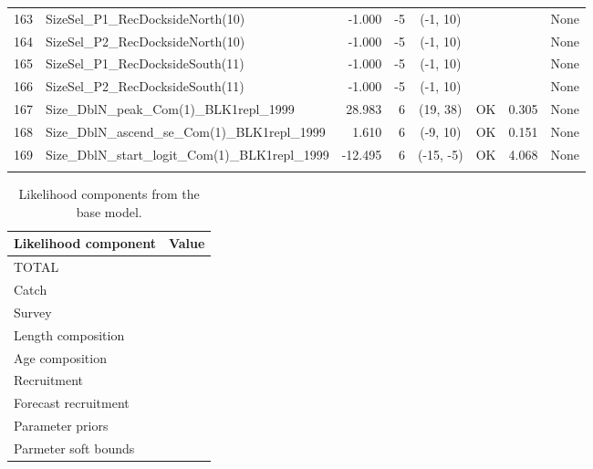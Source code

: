 \documentclass[12pt,]{article}
\begin{document}
\begin{landscape}
\begin{longtable}{rlrrcccp{1.5in}}
  163 & SizeSel\_P1\_RecDocksideNorth(10) & -1.000 & -5 & (-1, 10) &  &  & None \\ 
  164 & SizeSel\_P2\_RecDocksideNorth(10) & -1.000 & -5 & (-1, 10) &  &  & None \\ 
  165 & SizeSel\_P1\_RecDocksideSouth(11) & -1.000 & -5 & (-1, 10) &  &  & None \\ 
  166 & SizeSel\_P2\_RecDocksideSouth(11) & -1.000 & -5 & (-1, 10) &  &  & None \\ 
  167 & Size\_DblN\_peak\_Com(1)\_BLK1repl\_1999 & 28.983 & 6 & (19, 38) & OK & 0.305 & None \\ 
  168 & Size\_DblN\_ascend\_se\_Com(1)\_BLK1repl\_1999 & 1.610 & 6 & (-9, 10) & OK & 0.151 & None \\ 
  169 & Size\_DblN\_start\_logit\_Com(1)\_BLK1repl\_1999 & -12.495 & 6 & (-15, -5) & OK & 4.068 & None \\ 
   \hline
\hline
\label{tab:model_params}
\end{longtable}
\end{landscape}

\FloatBarrier

\begin{table}[ht]
\centering
\caption{Likelihood components from the base model.} 
\label{tab:like_components}
\begin{tabular}{ll}
  \hline
Likelihood component & Value \\ 
  \hline
TOTAL &  \\ 
  Catch &  \\ 
  Survey &  \\ 
  Length composition &  \\ 
  Age composition &  \\ 
  Recruitment &  \\ 
  Forecast recruitment &  \\ 
  Parameter priors &  \\ 
  Parmeter soft bounds &  \\ 
   \hline
\end{tabular}
\end{table}

\newpage
\end{document}

